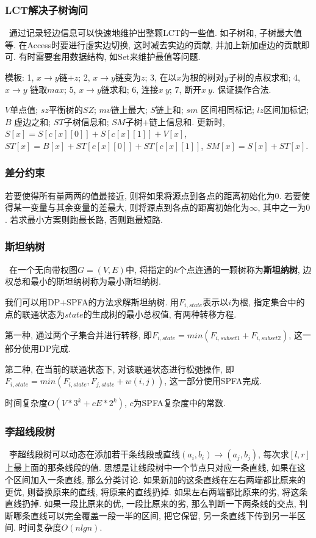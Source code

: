 \subsubsection{LCT解决子树询问}\
                通过记录轻边信息可以快速地维护出整颗LCT的一些值. 如子树和, 子树最大值等. 在Access时要进行虚实边切换, 这时减去实边的贡献, 并加上新加虚边的贡献即可. 有时需要套用数据结构, 如Set来维护最值等问题. 
                \par 模板: 1, $x\to y$链$+z$; 2, $x\to y$链变为$z$; 3, 在以$x$为根的树对$y$子树的点权求和; 4, $x\to y$ 链取$max$; 5, $x\to y$链求和; 6, 连接$x~y$; 7, 断开$x~y$. 保证操作合法. 
                \par $V$单点值; $sz$平衡树的$SZ$; $mv$链上最大; $S$链上和; $sm$ 区间相同标记; $lz$区间加标记; $B$ 虚边之和; $ST$子树信息和; $SM$子树+链上信息和. 更新时, $S[x]=S[c[x][0]]+S[c[x][1]]+V[x]$,   $ST[x]=B[x]+ST[c[x][0]]+ST[c[x][1]]$, $SM[x]=S[x]+ST[x]$. 

\subsubsection{差分约束}若要使得所有量两两的值最接近, 则将如果将源点到各点的距离初始化为$0$.  若要使得某一变量与其余变量的差最大, 则将源点到各点的距离初始化为$∞$, 其中之一为$0$.  若求最小方案则跑最长路, 否则跑最短路. 

\subsubsection{斯坦纳树}\
		在一个无向带权图$G=(V,E)$中, 将指定的$k$个点连通的一颗树称为\textbf{斯坦纳树}, 边权总和最小的斯坦纳树称为最小斯坦纳树. 
		\par 我们可以用DP+SPFA的方法求解斯坦纳树. 用$F_{i,state}$表示以$i$为根, 指定集合中的点的联通状态为$state$的生成树的最小总权值, 有两种转移方程. 
		\par 第一种, 通过两个子集合并进行转移, 即$F_{i,state}=min(F_{i,subset1} + F_{i,subset2})$, 这一部分使用DP完成. 
		\par 第二种, 在当前的联通状态下, 对该联通状态进行松弛操作, 即${F_{i,state}=min(F_{i,state},F_{j,state}+w(i,j))}$, 这一部分使用SPFA完成. 
        \par 时间复杂度$O(V*3^k+cE*2^k)$, $c$为SPFA复杂度中的常数. 

\subsubsection{李超线段树}\
        李超线段树可以动态在添加若干条线段或直线$(a_i,b_i)\to (a_j,b_j)$, 每次求$[l,r]$上最上面的那条线段的值. 思想是让线段树中一个节点只对应一条直线, 如果在这个区间加入一条直线, 那么分类讨论. 如果新加的这条直线在左右两端都比原来的更优, 则替换原来的直线, 将原来的直线扔掉. 如果左右两端都比原来的劣, 将这条直线扔掉. 如果一段比原来的优, 一段比原来的劣, 那么判断一下两条线的交点, 判断哪条直线可以完全覆盖一段一半的区间, 把它保留, 另一条直线下传到另一半区间. 时间复杂度$O(nlgn)$. 
